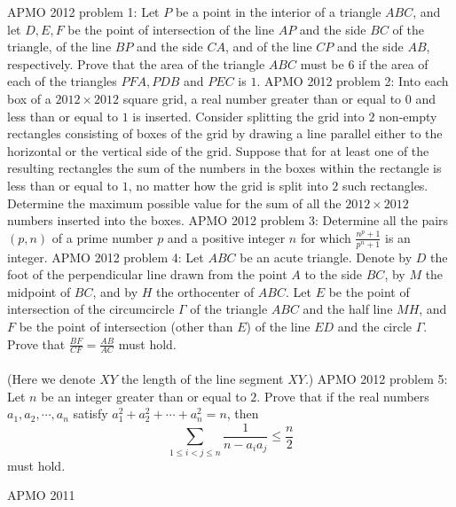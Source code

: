 APMO 2012 problem 1:  Let $ P $ be a point in the interior of a triangle $ ABC $, and let $ D, E, F $ be the point of intersection of the line $ AP $ and the side $ BC $ of the triangle, of the line $ BP $ and the side $ CA $, and of the line $ CP $ and the side $ AB $, respectively. Prove that the area of the triangle $ ABC $ must be $ 6  $ if the area of each of the triangles $ PFA, PDB $ and $ PEC $ is $ 1 $. 
APMO 2012 problem 2:  Into each box of a $ 2012 \times 2012 $ square grid, a real number greater than or equal to $ 0 $ and less than or equal to $ 1 $ is inserted. Consider splitting the grid into $2$ non-empty rectangles consisting of boxes of the grid by drawing a line parallel either to the horizontal or the vertical side of the grid. Suppose that for at least one of the resulting rectangles the sum of the numbers in the boxes within the rectangle is less than or equal to $ 1 $, no matter how the grid is split into $2$ such rectangles. Determine the maximum possible value for the sum of all the $ 2012 \times 2012 $ numbers inserted into the boxes. 
APMO 2012 problem 3:  Determine all the pairs $ (p , n )$ of a prime number $ p$ and a positive integer $ n$ for which $ \frac{ n^p + 1 }{p^n + 1} $ is an integer. 
APMO 2012 problem 4:  Let $ ABC $ be an acute triangle. Denote by $ D $ the foot of the perpendicular line drawn from the point $ A $ to the side $ BC $, by $M$ the midpoint of $ BC $, and by $ H $ the orthocenter of $ ABC $. Let $ E $ be the point of intersection of the circumcircle $ \Gamma $ of the triangle $ ABC $ and the half line $ MH $, and $ F $ be the point of intersection (other than  $E$) of the line $ ED $ and the circle $ \Gamma $. Prove that $ \tfrac{BF}{CF} = \tfrac{AB}{AC} $ must hold. \\\\
(Here we denote $XY$ the length of the line segment $XY$.) 
APMO 2012 problem 5:  Let $ n $ be an integer greater than or equal to $ 2 $. Prove that if the real numbers $ a_1 , a_2 , \cdots , a_n $ satisfy $ a_1 ^2 + a_2 ^2 + \cdots + a_n ^ 2 = n $, then
\[ \sum_{1 \le i < j \le n} \frac{1}{n- a_i a_j}  \le \frac{n}{2} \]
must hold. 

APMO 2011 

